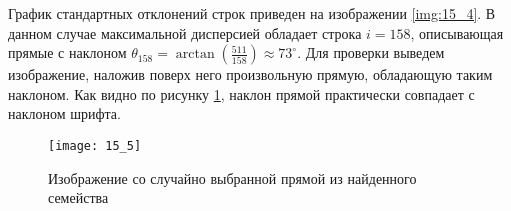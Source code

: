 График стандартных отклонений строк приведен на изображении \ref{img:15_4}. В данном случае максимальной дисперсией обладает строка $i=158$, описывающая прямые с наклоном $\theta_{158} = \arctan\left( \frac{511}{158} \right) \approx 73^{\circ}$. Для проверки выведем изображение, наложив поверх него произвольную прямую, обладающую таким наклоном. Как видно по рисунку \ref{img:15_5}, наклон прямой практически совпадает с наклоном шрифта.
\begin{figure}[!h]
    \centering
    \texttt{[image: 15\_5]}
    \caption{Изображение со случайно выбранной прямой из найденного семейства}
    \label{img:15_5}
\end{figure}
